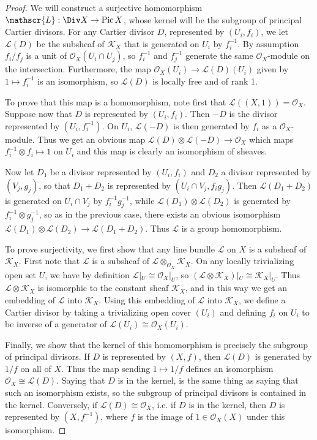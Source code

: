 \documentclass[a4paper,openany]{scrbook}
\DeclareMathOperator{\Pic}{Pic}
\begin{document}
\begin{proof} We will construct a surjective homomorphism $\mathscr{L}:\Div X\to\Pic X$, whose kernel will be the subgroup of principal Cartier divisors. For any Cartier divisor $D$, represented by $(U_i,f_i)$, we let $\mathscr{L}(D)$ be the subsheaf of $\mathscr{K}_X$ that is generated on $U_i$ by $f_i^{-1}$. By assumption $f_i/f_j$ is a unit of $\mathscr{O}_X(U_i\cap U_j)$, so $f_i^{-1}$ and $f_j^{-1}$ generate the same $\mathscr{O}_X$-module on the intersection. Furthermore, the map $\mathscr{O}_X(U_i)\to\mathscr{L}(D)(U_i)$ given by $1\mapsto f_i^{-1}$ is an isomorphism, so $\mathscr{L}(D)$ is locally free and of rank 1.

To prove that this map is a homomorphism, note first that $\mathscr{L}((X,1))=\mathscr{O}_X$. Suppose now that $D$ is represented by $(U_i,f_i)$. Then $-D$ is the divisor represented by $(U_i,f_i^{-1})$. On $U_i$, $\mathcal{L}(-D)$ is then generated by $f_i$ as a $\mathscr{O}_X$-module. Thus we get an obvious map $\mathscr{L}(D)\otimes\mathscr{L}(-D)\to\mathscr{O}_X$ which maps $f_i^{-1}\otimes f_i\mapsto 1$ on $U_i$ and this map is clearly an isomorphism of sheaves.

Now let $D_1$ be a divisor represented by $(U_i,f_i)$ and $D_2$ a divisor represented by $(V_j,g_j)$, so that $D_1+D_2$ is represented by $(U_i\cap V_j,f_ig_j)$. Then $\mathscr{L}(D_1+D_2)$ is generated on $U_i\cap V_j$ by $f_i^{-1}g_j^{-1}$, while $\mathscr{L}(D_1)\otimes\mathscr{L}(D_2)$ is generated by $f_i^{-1}\otimes g_j^{-1}$, so as in the previous case, there exists an obvious isomorphism $\mathscr{L}(D_1)\otimes\mathscr{L}(D_2)\to\mathscr{L}(D_1+D_2)$. Thus $\mathscr{L}$ is a group homomorphism.

To prove surjectivity, we first show that any line bundle $\mathscr{L}$ on $X$ is a subsheaf of $\mathscr{K}_X$. First note that $\mathscr{L}$ is a subsheaf of $\mathscr{L}\otimes_{\mathscr{O}_X}\mathscr{K}_X$. On any locally trivializing open set $U$, we have by definition $\mathscr{L}|_U\cong\mathscr{O}_X|_U$, so $(\mathscr{L}\otimes\mathscr{K}_X)|_U\cong\mathscr{K}_X|_U$. Thus $\mathscr{L}\otimes\mathscr{K}_X$ is isomorphic to the constant sheaf $\mathscr{K}_X$, and in this way we get an embedding of $\mathscr{L}$ into $\mathscr{K}_X$. Using this embedding of $\mathscr{L}$ into $\mathscr{K}_X$, we define a Cartier divisor by taking a trivializing open cover $(U_i)$ and defining $f_i$ on $U_i$ to be inverse of a generator of $\mathscr{L}(U_i)\cong\mathscr{O}_X(U_i)$.

Finally, we show that the kernel of this homomorphism is precisely the subgroup of principal divisors. If $D$ is represented by $(X,f)$, then $\mathscr{L}(D)$ is generated by $1/f$ on all of $X$. Thus the map sending $1\mapsto 1/f$ defines an isomorphism $\mathscr{O}_X\cong\mathscr{L}(D)$. Saying that $D$ is in the kernel, is the same thing as saying that such an isomorphism exists, so the subgroup of principal divisors is contained in the kernel. Conversely, if $\mathscr{L}(D)\cong\mathscr{O}_X$, i.e. if $D$ is in the kernel, then $D$ is represented by $(X,f^{-1})$, where $f$ is the image of $1\in\mathscr{O}_X(X)$ under this isomorphism.
\end{proof}
\end{document}
